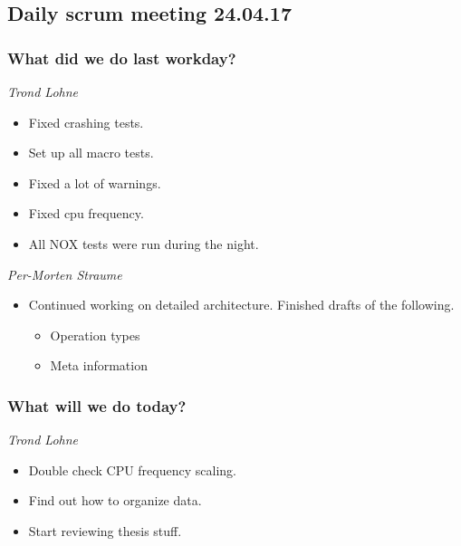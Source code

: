 \documentclass{article}
\begin{document}
\begin{center}
\subsection*{Daily scrum meeting 24.04.17}
\end{center}
\bigskip


\subsubsection*{What did we do last workday?}

\noindent\textit{Trond Lohne}
\begin{itemize}
	\item
	Fixed crashing tests.

	\item
	Set up all macro tests.

	\item
	Fixed a lot of warnings.

    \item
    Fixed cpu frequency.

    \item
    All NOX tests were run during the night.
\end{itemize}

\medskip

\noindent\textit{Per-Morten Straume}
\begin{itemize}
	\item
	Continued working on detailed architecture.
    Finished drafts of the following.
    \begin{itemize}
        \item
        Operation types

        \item
        Meta information
    \end{itemize}
\end{itemize}


\subsubsection*{What will we do today?}

\noindent\textit{Trond Lohne}
\begin{itemize}
	\item
	Double check CPU frequency scaling.

	\item
	Find out how to organize data.

	\item
	Start reviewing thesis stuff.
\end{itemize}
\end{document}
